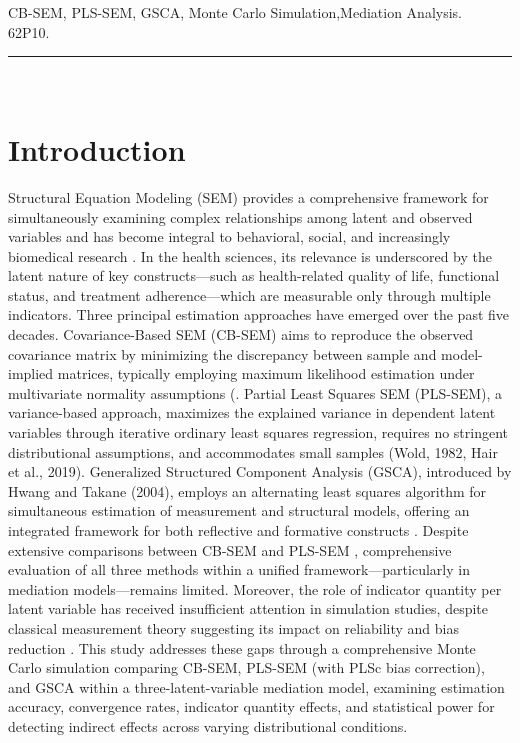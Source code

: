 \documentclass[twoside]{article}
\begin{document}
CB-SEM, PLS-SEM, GSCA, Monte Carlo Simulation,Mediation Analysis. \\
 62P10. \\
\hspace{1cm}\rule{\textwidth}{0.2mm}\\
\vspace{-2\baselineskip}
\section{Introduction}
Structural Equation Modeling (SEM) provides a comprehensive framework for simultaneously examining complex relationships among latent and observed variables \cite{JÖRESKOG:1973} and has become integral to behavioral, social, and increasingly biomedical research \cite {MACCALLUM:2000}. In the health sciences, its relevance is underscored by the latent nature of key constructs—such as health-related quality of life, functional status, and treatment adherence—which are measurable only through multiple indicators. Three principal estimation approaches have emerged over the past five decades. Covariance-Based SEM (CB-SEM) aims to reproduce the observed covariance matrix by minimizing the discrepancy between sample and model-implied matrices, typically employing maximum likelihood estimation under multivariate normality assumptions (\cite {BOLLEN:1989}. Partial Least Squares SEM (PLS-SEM), a variance-based approach, maximizes the explained variance in dependent latent variables through iterative ordinary least squares regression, requires no stringent distributional assumptions, and accommodates small samples (Wold, 1982, Hair et al., 2019). Generalized Structured Component Analysis (GSCA), introduced by Hwang and Takane (2004), employs an alternating least squares algorithm for simultaneous estimation of measurement and structural models, offering an integrated framework for both reflective and formative constructs \cite{HWANG:2004}. Despite extensive comparisons between CB-SEM and PLS-SEM \cite{REINARTZ:2009,CIVELEK:2018}, comprehensive evaluation of all three methods within a unified framework—particularly in mediation models—remains limited. Moreover, the role of indicator quantity per latent variable has received insufficient attention in simulation studies, despite classical measurement theory suggesting its impact on reliability and bias reduction \cite{MARSH:1998}. This study addresses these gaps through a comprehensive Monte Carlo simulation comparing CB-SEM, PLS-SEM (with PLSc bias correction), and GSCA within a three-latent-variable mediation model, examining estimation accuracy, convergence rates, indicator quantity effects, and statistical power for detecting indirect effects across varying distributional conditions.
\vspace{-1\baselineskip}
\end{document}
